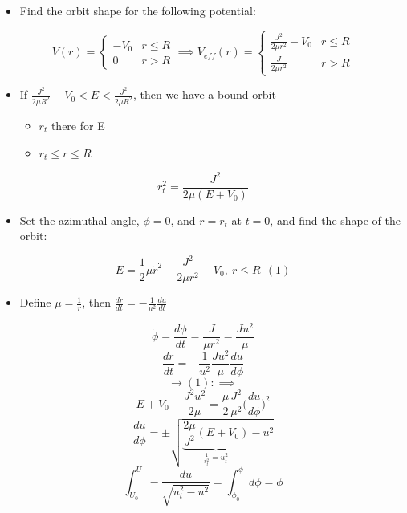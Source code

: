 \documentclass[a4paper,11pt,normalem]{article}
\begin{document}
\begin{example}
\begin{itemize}
\item
  Find the orbit shape for the following potential:
\end{itemize}

\[
    V(r) = \begin{cases} -V_0 & r \leq R \\ 0 & r > R \end{cases} \implies V_{eff}(r) = \begin{cases} \frac{J^2}{2\mu r^2} - V_0 & r \leq R \\ \frac{J}{2\mu r^2} & r > R \end{cases}
\]

\begin{itemize}
\item
  If \(\frac{J^2}{2\mu R^2} - V_0 < E < \frac{J^2}{2\mu R^2}\), then we
  have a bound orbit
  \begin{itemize}
  \item
    \(r_t\) there for E
  \item
    \(r_t \leq r \leq R\)
  \end{itemize}
\end{itemize}

\[
    r_{t}^2 = \frac{J^2}{2\mu (E + V_0)}
\]

\begin{itemize}
\item
  Set the azimuthal angle, \(\phi = 0\), and \(r = r_t\) at \(t = 0\),
  and find the shape of the orbit:
\end{itemize}

\[
    E = \frac{1}{2}\mu\dot{r}^2 + \frac{J^2}{2\mu r^2} - V_0,~ r \leq R ~~ (1)
\]

\begin{itemize}
\item
  Define \(\mu = \frac{1}{r}\), then
  \(\frac{dr}{dt} = -\frac{1}{u^2}\frac{du}{dt}\)
\end{itemize}

\[
    \dot{\phi} = \frac{d\phi}{dt} = \frac{J}{\mu r^2} = \frac{Ju^2}{\mu} \]
\[
    \frac{dr}{dt} = -\frac{1}{u^2}\frac{Ju^2}{\mu}\frac{du}{d\phi} \] \[
    \to (1): \implies \] \[
    E + V_0 - \frac{J^2 u^2}{2\mu} = \frac{\mu}{2}\frac{J^2}{\mu^2}\Big(\frac{du}{d\phi}\Big)^2 \]
\[
    \frac{du}{d\phi} = \pm \sqrt{\underbrace{\frac{2\mu}{J^2}(E + V_0)}_{\frac{1}{r_{t}^2} = u_{t}^2} - u^2} \]
\[
    \int_{U_0}^{U} -\frac{du}{\sqrt{u_{t}^2 - u^2}} = \int_{\phi_0}^{\phi} d\phi = \phi
\]


\end{example}
\end{document}
